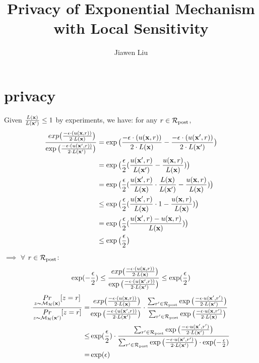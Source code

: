 \documentclass{article}
\begin{document}
\title{Privacy of Exponential Mechanism with Local Sensitivity}

\author[*]{Jiawen Liu}
\maketitle

\section{privacy}
Given $\frac{L(\textbf{x})}{L(\textbf{x}')} \leq 1$ by experiments, we have: for any $r \in \mathcal{R}_{\textup{post}}$,
  \begin{equation*}
  \begin{split}
  \frac {\
  exp\big(
  \frac{-\epsilon\cdot(u(\textbf{x}, {r}))}{2\cdot L(\textbf{x})}
  \big)}
  {\exp\big(
  \frac
  {-\epsilon\cdot(u(\textbf{x}', {r}))}{2\cdot L(\textbf{x}')}
  \big)}
  & = \exp\big(
  \frac{-\epsilon\cdot(u(\textbf{x}, {r}))}{2\cdot L(\textbf{x})}
  - 
  \frac{-\epsilon\cdot(u(\textbf{x}', {r}))}{2\cdot L(\textbf{x}')}
  \big)\\
  & = \exp
  \big(
  \frac{\epsilon}{2}
  (\frac{u(\textbf{x}', {r})}{L(\textbf{x}')}
  - 
  \frac{u(\textbf{x}, {r})}{ L(\textbf{x})})
  \big)\\
  & = \exp
  \big(
  \frac{\epsilon}{2}
  (\frac{u(\textbf{x}', {r})}{ L(\textbf{x})}\cdot \frac{L(\textbf{x})}{L(\textbf{x}')}
  - 
  \frac{u(\textbf{x}, {r})}{L(\textbf{x})} )
  \big)\\
  & \leq \exp
  \big(
  \frac{\epsilon}{2}
  (\frac{u(\textbf{x}', {r})}{ L(\textbf{x})}\cdot 1
  - 
  \frac{u(\textbf{x}, {r})}{L(\textbf{x})})
  \big)\\
  & = \exp
  \big(
  \frac{\epsilon}{2}
  (\frac{u(\textbf{x}', {r}) - u(\textbf{x}, {r})}{L(\textbf{x})})
  \big)\\
  & \leq \exp
  \big(
  \frac{\epsilon}{2}
  \big)
  \end{split}
  \end{equation*}
$\implies $ $\forall$ $r \in \mathcal{R}_{\textup{post}}$:
$$
\exp(-\frac{\epsilon}{2}) \leq \frac {\
  exp\big(
  \frac{-\epsilon\cdot(u(\textbf{x}, {r}))}{2\cdot L(\textbf{x})}
  \big)}
  {\exp\big(
  \frac
  {-\epsilon\cdot(u(\textbf{x}', {r}))}{2\cdot L(\textbf{x}')}
  \big)}
\leq \exp(\frac{\epsilon}{2})
$$
\begin{align*}
\frac{\underset{z \thicksim \mathcal{M}_{\mathcal{H}}(\textbf{x})}{Pr}[z = r]}{\underset{z \thicksim \mathcal{M}_{\mathcal{H}}(\textbf{x}')}{Pr}[z = r]}
= & \frac {\
  exp\big(
  \frac{-\epsilon\cdot(u(\textbf{x}, {r}))}{2\cdot L(\textbf{x})}
  \big)}
  {\exp\big(
  \frac
  {-\epsilon\cdot(u(\textbf{x}', {r}))}{2\cdot L(\textbf{x}')}
  \big)} 
  \cdot
  \frac{\sum_{r'\in \mathcal{R}_{\textup{post}}} \exp \big(\frac{-\epsilon\cdot u(\textbf{x}', r')}{2 \cdot L(\textbf{x}')}\big)}{\sum_{r'\in \mathcal{R}_{\textup{post}}} \exp \big(\frac{-\epsilon\cdot u(\textbf{x}, r')}{2 \cdot L(\textbf{x})}\big)}
  \\
\leq & \exp(\frac{\epsilon}{2}) 
\cdot 
\frac{\sum_{r'\in \mathcal{R}_{\textup{post}}} \exp \big(\frac{-\epsilon\cdot u(\textbf{x}', r')}{2 \cdot L(\textbf{x}')}\big)}
{\sum_{r'\in \mathcal{R}_{\textup{post}}} \exp \big(\frac{-\epsilon\cdot u(\textbf{x}', r')}{2 \cdot L(\textbf{x}')}\big)\cdot \exp(-\frac{\epsilon}{2})}\\
= & \exp(\epsilon)
\end{align*}
\end{document}
